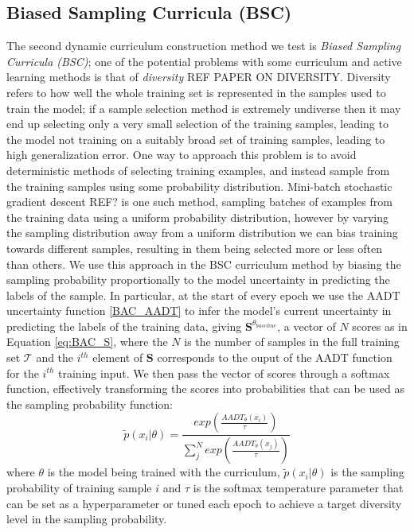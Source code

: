 \subsection{Biased Sampling Curricula (BSC)}
The second dynamic curriculum construction method we test is \textit{Biased Sampling Curricula (BSC)}; one of the potential problems with some curriculum and active learning methods is that of \textit{diversity} REF PAPER ON DIVERSITY. Diversity refers to how well the whole training set is represented in the samples used to train the model; if a sample selection method is extremely undiverse then it may end up selecting only a very small selection of the training samples, leading to the model not training on a suitably broad set of training samples, leading to high generalization error. One way to approach this problem is to avoid deterministic methods of selecting training examples, and instead sample from the training samples using some probability distribution. Mini-batch stochastic gradient descent REF? is one such method, sampling batches of examples from the training data using a uniform probability distribution, however by varying the sampling distribution away from a uniform distribution we can bias training towards different samples, resulting in them being selected more or less often than others. We use this approach in the BSC curriculum method by biasing the sampling probability proportionally to the model uncertainty in predicting the labels of the sample. In particular, at the start of every epoch we use the AADT uncertainty function \ref{BAC_AADT} to infer the model's current uncertainty in predicting the labels of the training data, giving $\mathbf{S}^{\theta_{baseline}}$, a vector of $N$ scores as in Equation \ref{eq:BAC_S}, where the $N$ is the number of samples in the full training set $\mathcal{T}$ and the $i^{th}$ element of $\mathbf{S}$ corresponds to the ouput of the AADT function for the $i^{th}$ training input. We then pass the vector of scores through a softmax function, effectively transforming the scores into probabilities that can be used as the sampling probability function:
\begin{equation}
\tilde{p}(x_i | \theta) = \frac{exp(\frac{AADT_{\theta}(x_i)}{\tau})}{\sum_{j}^{N} exp(\frac{AADT_{\theta}(x_j)}{\tau})}
\end{equation}
where $\theta$ is the model being trained with the curriculum, $\tilde{p}(x_i | \theta)$ is the sampling probability of training sample $i$ and $\tau$ is the softmax temperature parameter that can be set as a hyperparameter or tuned each epoch to achieve a target diversity level in the sampling probability. 
